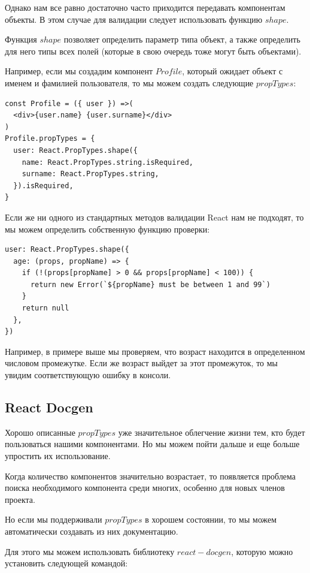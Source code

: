 Однако нам все равно достаточно часто приходится передавать компонентам объекты. В этом случае для валидации следует использовать функцию $shape$.

Функция $shape$ позволяет определить параметр типа объект, а также определить для него типы всех полей (которые в свою очередь тоже могут быть объектами).

Например, если мы создадим компонент $Profile$, который ожидает объект с именем и фамилией пользователя, то мы можем создать следующие $propTypes$:

\begin{lstlisting}
const Profile = ({ user }) =>(
  <div>{user.name} {user.surname}</div>
)
Profile.propTypes = {
  user: React.PropTypes.shape({
    name: React.PropTypes.string.isRequired,
    surname: React.PropTypes.string,
  }).isRequired,
}
\end{lstlisting}

Если же ни одного из стандартных методов валидации React нам не подходят, то мы можем определить собственную функцию проверки:

\begin{lstlisting}
user: React.PropTypes.shape({
  age: (props, propName) => {
    if (!(props[propName] > 0 && props[propName] < 100)) {
      return new Error(`${propName} must be between 1 and 99`)
    }
    return null
  },
})
\end{lstlisting}

Например, в примере выше мы проверяем, что возраст находится в определенном числовом промежутке. Если же возраст выйдет за этот промежуток, то мы увидим соответствующую ошибку в консоли.

\subsection{React Docgen}

Хорошо описанные $propTypes$ уже значительное облегчение жизни тем, кто будет пользоваться нашими компонентами. Но мы можем пойти дальше и еще больше упростить их использование.

Когда количество компонентов значительно возрастает, то появляется проблема поиска необходимого компонента среди многих, особенно для новых членов проекта.

Но если мы поддерживали $propTypes$ в хорошем состоянии, то мы можем автоматически создавать из них документацию.

Для этого мы можем использовать библиотеку $react-docgen$, которую можно установить следующей командой:

